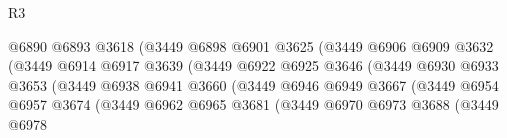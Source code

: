 \begin{lexlean}{R3}
\begin{coremodule}
                                          @6890
                                          @6893
                                          @3618
                                          (@3449
                                            @6898
                                            @6901
                                            @3625
                                            (@3449
                                              @6906
                                              @6909
                                              @3632
                                              (@3449
                                                @6914
                                                @6917
                                                @3639
                                                (@3449
                                                  @6922
                                                  @6925
                                                  @3646
                                                  (@3449
                                                    @6930
                                                    @6933
                                                    @3653
                                                    (@3449
                                                      @6938
                                                      @6941
                                                      @3660
                                                      (@3449
                                                        @6946
                                                        @6949
                                                        @3667
                                                        (@3449
                                                          @6954
                                                          @6957
                                                          @3674
                                                          (@3449
                                                            @6962
                                                            @6965
                                                            @3681
                                                            (@3449
                                                              @6970
                                                              @6973
                                                              @3688
                                                              (@3449
                                                                @6978

\end{coremodule}
\end{lexlean}
